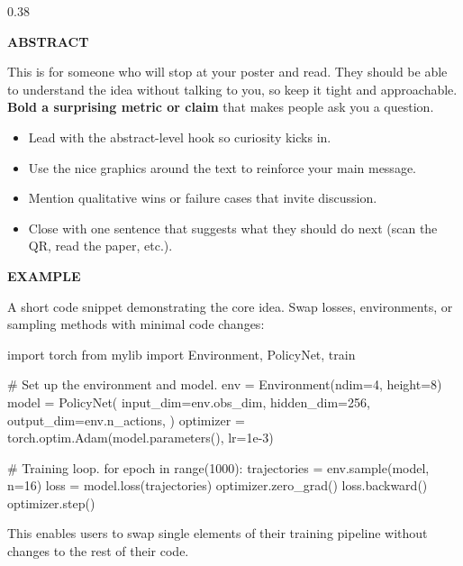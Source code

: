 \documentclass[final]{beamer}
\newcommand{\SectionHeading}[1]{\fontsize{36}{43.2}\selectfont\bfseries #1}
\begin{document}
\begin{frame}[t,fragile]
\begin{columns}[t,totalwidth=\textwidth]
\begin{column}{0.38\paperwidth}
            \begin{tcolorbox}[posterbox]
                {\SectionHeading{ABSTRACT}}
                \vspace{0.5em}

                This is for someone who will stop at your poster and read. They should be able
                to understand the idea without talking to you, so keep it tight and approachable.
                \textbf{Bold a surprising metric or claim} that makes people ask you a question.

                \vspace{2cm}
                \begin{itemize}
                    \item Lead with the abstract-level hook so curiosity kicks in.
                    \item Use the nice graphics around the text to reinforce your main message.
                    \item Mention qualitative wins or failure cases that invite discussion.
                    \item Close with one sentence that suggests what they should do next (scan the QR, read the paper, etc.).
                \end{itemize}

                \vspace{2cm}
                {\SectionHeading{EXAMPLE}}
                \vspace{0.5em}

                A short code snippet demonstrating the core idea. Swap losses, environments,
                or sampling methods with minimal code changes:

\vspace{1cm}
\begin{python}
import torch
from mylib import Environment, PolicyNet, train

# Set up the environment and model.
env = Environment(ndim=4, height=8)
model = PolicyNet(
    input_dim=env.obs_dim,
    hidden_dim=256,
    output_dim=env.n_actions,
)
optimizer = torch.optim.Adam(model.parameters(), lr=1e-3)

# Training loop.
for epoch in range(1000):
    trajectories = env.sample(model, n=16)
    loss = model.loss(trajectories)
    optimizer.zero_grad()
    loss.backward()
    optimizer.step()
\end{python}

\vspace{1cm}
This enables users to swap single elements of their training pipeline without
changes to the rest of their code.


\end{tcolorbox}
\end{column}
\end{columns}
\end{frame}
\end{document}
